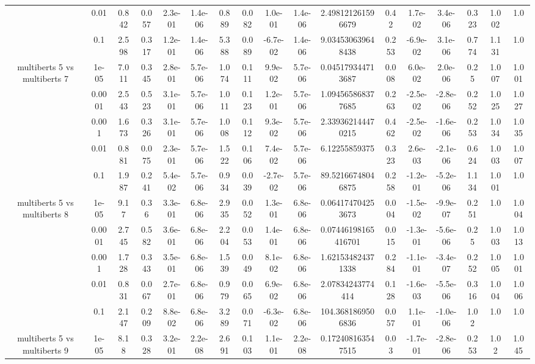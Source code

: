 \begin{tabular}{|c|c|c|c|c|c|c|c|c|c|c|c|c|c|c|c|c|}
 & 0.01 & 0.842 & 0.057 & 2.3e-01 & 1.4e-06 & 0.889 & 0.082 & 1.0e-01 & 1.4e-06 & 2.498121261596679 & 0.42 & 1.7e-02 & 3.4e-06 & 0.323 & 1.002 & 1.0 \\
 & 0.1 & 2.598 & 0.317 & 1.2e-01 & 1.4e-06 & 5.388 & 0.089 & -6.7e-02 & 1.4e-06 & 9.034530639648438 & 0.253 & -6.9e-02 & 3.1e-06 & 0.774 & 1.131 & 1.0 \\
\hline
\multirow{5}{*}{multiberts 5 vs multiberts 7} & 1e-05 & 7.011 & 0.345 & 2.8e-01 & 5.7e-06 & 1.074 & 0.111 & 9.9e-02 & 5.7e-06 & 0.045179344713687 & 0.008 & 6.0e-02 & 2.0e-06 & 0.25 & 1.007 & 1.001 \\
 & 0.0001 & 2.543 & 0.523 & 3.1e-01 & 5.7e-06 & 1.011 & 0.123 & 1.2e-01 & 5.7e-06 & 1.094565868377685 & 0.263 & -2.5e-02 & -2.8e-06 & 0.252 & 1.025 & 1.027 \\
 & 0.001 & 1.673 & 0.326 & 3.1e-01 & 5.7e-06 & 1.008 & 0.112 & 9.3e-02 & 5.7e-06 & 2.339362144470215 & 0.462 & -2.5e-02 & -1.6e-06 & 0.253 & 1.034 & 1.035 \\
 & 0.01 & 0.881 & 0.075 & 2.3e-01 & 5.7e-06 & 1.522 & 0.106 & 7.4e-02 & 5.7e-06 & 6.12255859375 & 0.323 & 2.6e-03 & -2.1e-06 & 0.624 & 1.003 & 1.007 \\
 & 0.1 & 1.987 & 0.241 & 5.4e-02 & 5.7e-06 & 0.934 & 0.039 & -2.7e-02 & 5.7e-06 & 89.52166748046875 & 0.258 & -1.2e-01 & -5.2e-06 & 1.134 & 1.001 & 1.0 \\
\hline
\multirow{5}{*}{multiberts 5 vs multiberts 8} & 1e-05 & 9.17 & 0.36 & 3.3e-01 & 6.8e-06 & 2.935 & 0.052 & 1.3e-01 & 6.8e-06 & 0.064174704253673 & 0.004 & -1.5e-02 & -9.9e-07 & 0.251 & 1.0 & 1.004 \\
 & 0.0001 & 2.745 & 0.582 & 3.6e-01 & 6.8e-06 & 2.204 & 0.053 & 1.4e-01 & 6.8e-06 & 0.07446198165416701 & 0.015 & -1.3e-01 & -5.6e-06 & 0.25 & 1.003 & 1.013 \\
 & 0.001 & 1.728 & 0.343 & 3.5e-01 & 6.8e-06 & 1.539 & 0.049 & 8.1e-02 & 6.8e-06 & 1.621534824371338 & 0.284 & -1.1e-01 & -3.4e-07 & 0.252 & 1.005 & 1.001 \\
 & 0.01 & 0.831 & 0.067 & 2.7e-01 & 6.8e-06 & 0.979 & 0.065 & 6.9e-02 & 6.8e-06 & 2.07834243774414 & 0.128 & -1.6e-03 & -5.5e-06 & 0.316 & 1.004 & 1.006 \\
 & 0.1 & 2.147 & 0.209 & 8.8e-02 & 6.8e-06 & 3.289 & 0.071 & -6.3e-02 & 6.8e-06 & 104.3681869506836 & 0.057 & 1.1e-01 & -1.0e-06 & 1.02 & 1.0 & 1.0 \\
\hline
\multirow{5}{*}{multiberts 5 vs multiberts 9} & 1e-05 & 8.18 & 0.328 & 3.2e-01 & 2.2e-08 & 2.691 & 0.103 & 1.1e-01 & 2.2e-08 & 0.172408163547515 & 0.03 & -1.7e-01 & -2.8e-06 & 0.253 & 1.02 & 1.045 \\

\end{tabular}
